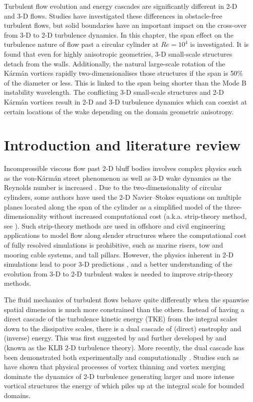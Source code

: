 \documentclass[../main.tex]{subfiles}
\begin{document}
\vspace{0.25cm}
Turbulent flow evolution and energy cascades are significantly different in 2-D and 3-D flows.
Studies have investigated these differences in obstacle-free turbulent flows, but solid boundaries have an important impact on the cross-over from 3-D to 2-D turbulence dynamics.
In this chapter, the span effect on the turbulence nature of flow past a circular cylinder at $Re=10^4$ is investigated.
It is found that even for highly anisotropic geometries, 3-D small-scale structures detach from the walls.
Additionally, the natural large-scale rotation of the K\'{a}rm\'{a}n vortices rapidly two-dimensionalises those structures if the span is 50\% of the diameter or less.
This is linked to the span being shorter than the Mode B instability wavelength.
The conflicting 3-D small-scale structures and 2-D K\'{a}rm\'{a}n vortices result in 2-D and 3-D turbulence dynamics which can coexist at certain locations of the wake depending on the domain geometric anisotropy.

\section{Introduction and literature review}

Incompressible viscous flow past 2-D bluff bodies involves complex physics such as the von-K\'{a}rm\'{a}n street phenomenon as well as 3-D wake dynamics as the Reynolds number is increased \citep{Roshko1954, Williamson1996b, Williamson1996a}.
Due to the two-dimensionality of circular cylinders, some authors have used the 2-D Navier--Stokes equations on multiple planes located along the span of the cylinder as a simplified model of the three-dimensionality without increased computational cost (a.k.a. strip-theory method, see ).
Such strip-theory methods are used in offshore and civil engineering applications to model flow along slender structures where the computational cost of fully resolved simulations is prohibitive, such as marine risers, tow and mooring cable systems, and tall pillars.
However, the physics inherent in 2-D simulations lead to poor 3-D predictions \citep{Bao2016}, and a better understanding of the evolution from 3-D to 2-D turbulent wakes is needed to improve strip-theory methods.

The fluid mechanics of turbulent flows behave quite differently when the spanwise spatial dimension is much more constrained than the others.
Instead of having a direct cascade of the turbulence kinetic energy (TKE) from the integral scales down to the dissipative scales, there is a dual cascade of (direct) enstrophy and (inverse) energy.
This was first suggested by \cite{Kraichnan1967} and further developed by \cite{Leith1968} and \cite{Batchelor1969} (known as the KLB 2-D turbulence theory).
More recently, the dual cascade has been demonstrated both experimentally and computationally \citep[for a comprehensive review see][]{Boffetta2012}.
Studies such as \cite{Xiao2009} have shown that physical processes of vortex thinning and vortex merging dominate the dynamics of 2-D turbulence generating larger and more intense vortical structures the energy of which piles up at the integral scale for bounded domains.
\end{document}
